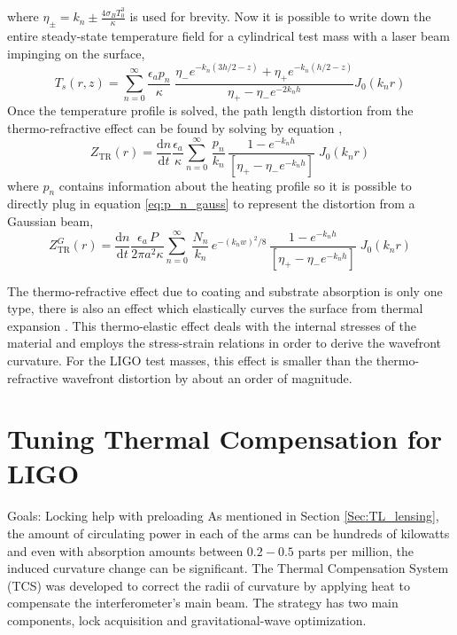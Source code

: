 	where $\eta_{\pm} = k_n \pm \frac{4\sigma_B T_0^3}{\kappa}$ is used for brevity. Now it is possible to write down the entire steady-state temperature field for a cylindrical test mass with a laser beam impinging on the surface,
	\begin{equation}
	T_s(r,z) = \sum_{n=0}^{\infty} \frac{\epsilon_a p_n}{\kappa}  \; \frac{ \eta_{-}e^{-k_n(3h/2-z)} + \eta_{+}e^{-k_n(h/2-z)}  }{\eta_{+} - \eta_{-} e^{-2k_n h} } J_0(k_n r)
	\end{equation} 
	Once the temperature profile is solved, the path length distortion from the thermo-refractive effect can be found by solving by equation \label{eq:thermoref},
	\begin{equation}
	Z_{\text{TR}}(r) = \frac{\text{d}n}{\text{d}t} \frac{\epsilon_a}{\kappa} \sum_{n=0}^{\infty} \, \frac{p_n}{k_n} \, \frac{1- e^{-k_n h}}{[\eta_{+} - \eta_{-} e^{-k_nh}]} \; J_0(k_n r) 
	\end{equation}
	where $p_n$ contains information about the heating profile so it is possible to directly plug in equation \ref{eq:p_n_gauss} to represent the distortion from a Gaussian beam,
	\begin{equation}
	Z_{\text{TR}}^{G}(r) =  \frac{\text{d}n}{\text{d}t} \frac{\epsilon_a \, P}{2\pi a^2 \kappa} \sum_{n=0}^{\infty} \, \frac{N_n}{k_n}\, e^{-(k_n w)^2/8} \, \frac{1- e^{-k_n h}}{[\eta_{+} - \eta_{-} e^{-k_nh}]} \; J_0(k_n r) 
	\end{equation}

	The thermo-refractive effect due to coating and substrate absorption is only one type, there is also an effect which elastically curves the surface from thermal expansion \cite{Vinet_Thermal_Issues}.  This thermo-elastic effect deals with the internal stresses of the material and employs the stress-strain relations in order to derive the wavefront curvature.  For the LIGO test masses, this effect is smaller than the thermo-refractive wavefront distortion by about an order of magnitude.
	
	
	
	\section{Tuning Thermal Compensation for LIGO}
	Goals: Locking help with preloading \cite{Lawrence_TCS} \cite{AWC_current} \cite{winkler_thermaldist} \cite{Strain_TL}
	As mentioned in Section \ref{Sec:TL_lensing}, the amount of circulating power in each of the arms can be hundreds of kilowatts and even with absorption amounts between $0.2-0.5$ parts per million, the induced curvature change can be significant.  The Thermal Compensation System (TCS) was developed to correct the radii of curvature by applying heat to compensate the interferometer's main beam.  The strategy has two main components, lock acquisition and gravitational-wave optimization.
	
